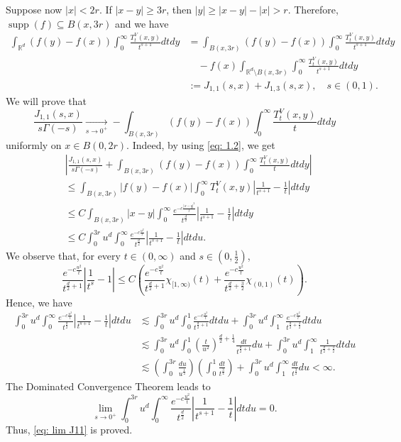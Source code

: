 \documentclass[10pt, a4paper, reqno]{amsart}
\theoremstyle{definition}
\theoremstyle{remark}
\DeclareMathOperator{\supp}{supp}
\newcommand{\RR}{\mathbb{R}}
\numberwithin{equation}{section}
\begin{document}
Suppose now $|x|<2r$. If $|x-y|\geq  3r$, then $|y|\geq |x-y|-|x|>r$. Therefore, $\supp(f) \subseteq B(x,3r)$ and we have
\begin{align*}
    \int_{\RR^d}(f(y)-f(x))\int_0^\infty \frac{T_t^V(x,y)}{t^{s+1}}dtdy&=\int_{B(x,3r)} (f(y)-f(x))\int_0^\infty \frac{T_t^V(x,y)}{t^{s+1}}dtdy\\
    &\quad -f(x) \int_{\RR^d\setminus B(x,3r)} \int_0^\infty \frac{T_t^V(x,y)}{t^{s+1}}dtdy\\
    &:=J_{1,1}(s,x)+J_{1,3}(s,x), \quad s\in (0,1).
\end{align*}
We will prove that
\begin{equation}\label{eq: lim J11}
    \frac{J_{1,1}(s,x)}{s\Gamma(-s)}\underset{s\to 0^+}{\longrightarrow} -\int_{B(x,3r)}(f(y)-f(x))\int_0^\infty \frac{T_t^V(x,y)}{t}dtdy
\end{equation}
uniformly on $x\in B(0,2r)$. Indeed, by using \eqref{eq: 1.2}, we get
\begin{align*}
    &\left| \frac{J_{1,1}(s,x)}{s\Gamma(-s)}+\int_{B(x,3r)}(f(y)-f(x))\int_0^\infty \frac{T_t^V(x,y)}{t}dtdy\right|\\
    &\leq \int_{B(x,3r)}|f(y)-f(x)| \int_0^\infty T_t^V(x,y)\left|\frac{1}{t^{s+1}}-\frac1t\right|dtdy\\
    &\leq C \int_{B(x,3r)}|x-y| \int_0^\infty \frac{e^{-c\frac{|x-y|^2}{t}}}{t^{\frac d2}}\left|\frac{1}{t^{s+1}}-\frac1t\right|dtdy\\
    &\leq C \int_0^{3r} u^d \int_0^\infty \frac{e^{-c\frac{u^2}{t}}}{t^{\frac d2}}\left|\frac{1}{t^{s+1}}-\frac1t\right|dtdu.
\end{align*}
We observe that, for every $t\in (0,\infty)$ and $s\in (0,\tfrac12)$,
\[\frac{e^{-c\frac{u^2}{t}}}{t^{\frac d2+1}}\left|\frac{1}{t^{s}}-1\right|\leq C\left(\frac{e^{-c\frac{u^2}{t}}}{t^{\frac d2+1}}\chi_{[1,\infty)}(t)+\frac{e^{-c\frac{u^2}{t}}}{t^{\frac d2+\frac32}}\chi_{(0,1)}(t)\right).\]
Hence, we have
\begin{align*}
    \int_0^{3r} u^d \int_0^\infty \frac{e^{-c\frac{u^2}{t}}}{t^{\frac d2}}\left|\frac{1}{t^{s+1}}-\frac1t\right|dtdu &\lesssim \int_0^{3r} u^d \int_0^1 \frac{e^{-c\frac{u^2}{t}}}{t^{\frac d2+1}} dtdu+\int_0^{3r} u^d \int_1^\infty \frac{e^{-c\frac{u^2}{t}}}{t^{\frac d2+\frac32}} dtdu\\
    &\lesssim \int_0^{3r} u^d \int_0^1 \left(\frac{t}{u^2}\right)^{\frac d2+\frac14} \frac{dt}{t^{\frac d2+1}}du+\int_0^{3r} u^d \int_1^\infty \frac{1}{t^{\frac d2+\frac32}} dtdu\\
    &\lesssim \left(\int_0^{3r} \frac{du}{u^{\frac12}} \right)\left(\int_0^1 \frac{dt}{t^{\frac34}}\right)+\int_0^{3r} u^d \int_1^\infty \frac{dt}{t^{\frac32}} du<\infty.
\end{align*}
The Dominated Convergence Theorem leads to
\[\lim_{s\to 0^+} \int_0^{3r} u^d \int_0^\infty \frac{e^{-c\frac{u^2}{t}}}{t^{\frac d2}}\left|\frac{1}{t^{s+1}}-\frac1t\right|dtdu=0.\]
Thus, \eqref{eq: lim J11} is proved.
\end{document}
